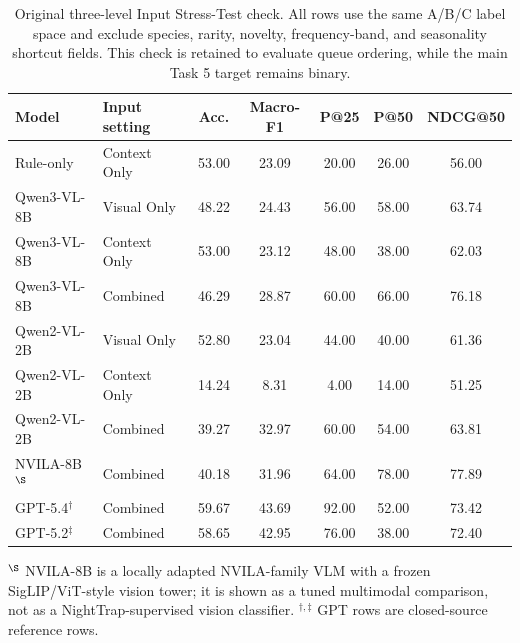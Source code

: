 \documentclass{article}
\begin{document}
\begin{table}[h]
\centering
\caption{Original three-level Input Stress-Test check. All rows use the same A/B/C label space and exclude species, rarity, novelty, frequency-band, and seasonality shortcut fields. This check is retained to evaluate queue ordering, while the main Task 5 target remains binary.}
\label{tab:threeway_diagnostic}
\small
\setlength{\tabcolsep}{6pt}
\begin{tabular}{llccccc}
\toprule
Model & Input setting & Acc. & Macro-F1 & P@25 & P@50 & NDCG@50 \\
\midrule
Rule-only & Context Only & 53.00 & 23.09 & 20.00 & 26.00 & 56.00 \\
Qwen3-VL-8B & Visual Only & 48.22 & 24.43 & 56.00 & 58.00 & 63.74 \\
Qwen3-VL-8B & Context Only & 53.00 & 23.12 & 48.00 & 38.00 & 62.03 \\
Qwen3-VL-8B & Combined & 46.29 & 28.87 & 60.00 & 66.00 & 76.18 \\
Qwen2-VL-2B & Visual Only & 52.80 & 23.04 & 44.00 & 40.00 & 61.36 \\
Qwen2-VL-2B & Context Only & 14.24 & 8.31 & 4.00 & 14.00 & 51.25 \\
Qwen2-VL-2B & Combined & 39.27 & 32.97 & 60.00 & 54.00 & 63.81 \\
NVILA-8B$^{\S}$ & Combined & 40.18 & 31.96 & 64.00 & 78.00 & 77.89 \\
GPT-5.4$^{\dagger}$ & Combined & 59.67 & 43.69 & 92.00 & 52.00 & 73.42 \\
GPT-5.2$^{\ddagger}$ & Combined & 58.65 & 42.95 & 76.00 & 38.00 & 72.40 \\
\bottomrule
\end{tabular}
\vspace{0.25em}
\begin{minipage}{0.97\linewidth}
\footnotesize
$^{\S}$ NVILA-8B is a locally adapted NVILA-family VLM with a frozen SigLIP/ViT-style vision tower; it is shown as a tuned multimodal comparison, not as a NightTrap-supervised vision classifier. $^{\dagger,\ddagger}$ GPT rows are closed-source reference rows.
\end{minipage}
\end{table}
\end{document}
